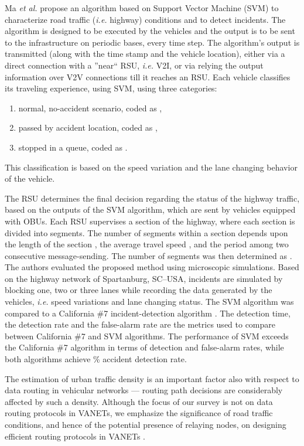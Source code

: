 \documentclass[10pt,onecolumn]{article}
\begin{document}
Ma \textit{et al.} \cite{Ma2009} propose an algorithm based on Support Vector Machine (SVM) to characterize road traffic (\textit{i.e.} highway) conditions and to detect incidents. The algorithm is designed to be executed by the vehicles and the output is to be sent to the infrastructure on periodic bases, every  time step. 
The algorithm's output is transmitted (along with the time stamp and the vehicle location), either via a direct connection with a ''near`` RSU, \textit{i.e.} V2I, or via relying the output information over V2V connections till it reaches an RSU. 
Each vehicle classifies its traveling experience, using SVM, using three categories:
\begin{enumerate}
 \item normal, no-accident scenario, coded as ,
 \item passed by accident location, coded as ,
 \item stopped in a queue, coded as .
\end{enumerate}
This classification is based on the speed variation and the lane changing behavior of the vehicle.

The RSU determines the final decision regarding the status of the highway traffic, based on the outputs of the SVM algorithm, which are sent by vehicles equipped with OBUs.
Each RSU supervises a section of the highway, where each section is divided into segments. The number of segments  within
a section  depends upon the length of the section , the average travel speed , and the period  among two 
consecutive message-sending. The number of segments was then determined as .
The authors evaluated the proposed method using microscopic simulations. 
Based on the highway network of Spartanburg, SC--USA, incidents are simulated by blocking one, two or three lanes while recording the data generated by the vehicles, \textit{i.e.} speed variations and lane changing status.
The SVM algorithm was compared to a California \#7 incident-detection algorithm \cite{cali7}. 
The detection time, the detection rate and the false-alarm rate are the metrics used to compare between California \#7 and SVM algorithms. 
The performance of SVM exceeds the California \#7 algorithm in terms of detection and false-alarm rates, while both algorithms achieve \% accident detection rate.

The estimation of urban traffic density is an important factor also with respect to data routing in vehicular networks --- routing path decisions are considerably affected by such a density. Although the focus of our survey is not on data routing protocols in VANETs, we emphasize the significance of road traffic conditions, and hence of the potential presence of relaying nodes, on designing efficient routing protocols in VANETs \cite{Rondinone2010}. 
\end{document}
